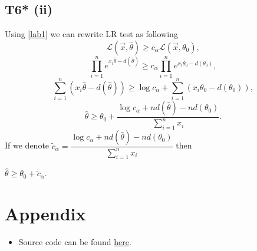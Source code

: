 \documentclass[a4paper, 12pt]{article}
\begin{document}
\subsection*{T6* (ii)}
Using \eqref{lab1} we can rewrite LR test as following
$$
\mathcal{L}(\vec{x}, \hat{\theta}) \geqslant c_{\alpha} \mathcal{L}(\vec{x}, \theta_0),
$$
$$
\prod \limits_{i=1}^n e^{x_i \hat{\theta} - d(\hat{\theta})} \geqslant c_{\alpha} \prod \limits_{i=1}^n e^{x_i \theta_0 - d(\theta_0)},
$$
$$
\sum \limits_{i=1}^n (x_i \hat{\theta} - d(\hat{\theta})) \geqslant \log c_{\alpha} + \sum \limits_{i=1}^n (x_i \theta_0 - d(\theta_0)),
$$
$$
\hat{\theta} \geqslant \theta_0 + \dfrac{\log c_{\alpha} + n d(\hat{\theta}) - n d(\theta_0)}{\sum \limits_{i=1}^n x_i}.
$$
If we denote $\widetilde{c}_{\alpha} = \dfrac{\log c_{\alpha} + n d(\hat{\theta}) - n d(\theta_0)}{\sum \limits_{i=1}^n x_i}$ then
\begin{tcolorbox}
[enhanced,width=\textwidth,center upper,
 fontupper=\large\bfseries,
 drop fuzzy shadow southeast,
 colframe=red!50!black,colback=yellow!25]
$
\hat{\theta} \geqslant \theta_0 + \widetilde{c}_{\alpha}.
$
\end{tcolorbox}

\section*{Appendix}
\begin{itemize}
	\item Source code can be found \href{https://github.com/vitomania/ozon/blob/master/stats/hw3/hw3.ipynb}{here}.
\end{itemize}
\end{document}
